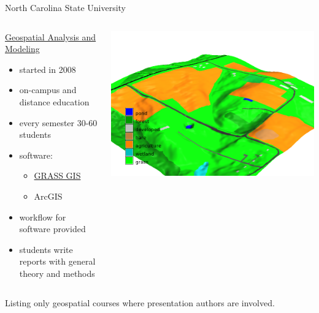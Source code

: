 \documentclass[xcolor={dvipsnames,usenames},beamer,aspectratio=169]{beamer}
\begin{document}
\newcommand{\coursesTitle}{North Carolina State University}

\begin{frame}{\coursesTitle}

\begin{columns}[c]


\begin{block}{\href{http://courses.ncsu.edu/gis582/common/}%
  {Geospatial Analysis and Modeling}}
\begin{itemize}
 \item started in 2008
 \item on-campus and distance education
 \item every semester 30-60 students
 \item software:
 \begin{itemize}
   \item \href{http://grass.osgeo.org}{GRASS GIS}
   \item ArcGIS
 \end{itemize}
 \item workflow for software provided
 \item students write reports with general theory and methods
\end{itemize}
\end{block}


\includegraphics[width=\textwidth]{./images/edu/secref}%

\end{columns}

\bigskip

Listing only geospatial courses where presentation authors are involved.

\end{frame}
\end{document}
